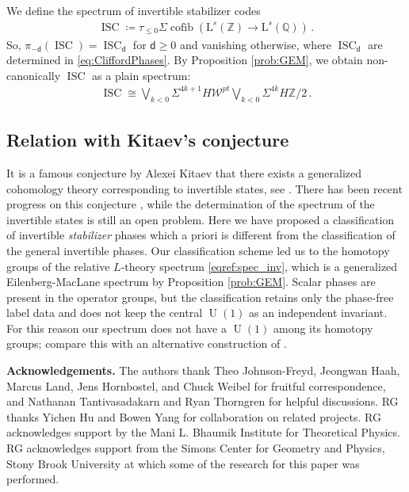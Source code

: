 \documentclass[sn-mathphys-num]{sn-jnl}
\theoremstyle{definition}
\numberwithin{equation}{section}
\theoremstyle{definition}
\def\CW {{\mathcal W}}
\def\L{{\mbox{L}}}
\def\IQ{\mathbb{Q}}
\def\IZ{{\mathbb{Z}}}
\newcommand{\dd}{{\mathsf{d}}} %
\begin{document}
We define the spectrum of invertible stabilizer codes
\begin{align}\label{eqref:spec_inv}
\operatorname{ISC}\coloneqq \tau_{\leqslant 0}\Sigma \operatorname{ cofib}( \L^s(\IZ)\rightarrow   
 \L^s(\IQ))\,.
\end{align}
So, $\pi_{-\dd}(\operatorname{ISC})= \operatorname{ISC}_{\dd}$ for $\dd\geqslant 0$ and vanishing otherwise, where $\operatorname{ISC}_{\dd}$ are determined in \eqref{eq:CliffordPhases}.
By Proposition \ref{prob:GEM}, we obtain non-canonically $\operatorname{ISC}$ as a plain spectrum:
 \begin{align}
\operatorname{ISC}\cong \bigvee_{k< 0}\Sigma ^{4k+1}H\CW^{pt}\bigvee_{k<0}\Sigma ^{4k} H\IZ/2\,.
\end{align}

\subsection{Relation with Kitaev's conjecture}
 It is a famous conjecture by Alexei Kitaev \cite{Kitaev} that there exists a generalized cohomology theory corresponding to invertible states, see \cite{kapustin2014symmetryprotectedtopologicalphases,xiong2018minimalist,Gaiotto_2019,Freed_2021,Shiozaki2022}. There has been recent progress on this conjecture \cite{kubota2025stablehomotopytheoryinvertible}, while the determination of the spectrum of the invertible states is still an open problem. Here we have proposed a classification of invertible \textit{stabilizer} phases which a priori is different from the classification of the general invertible phases. Our classification scheme led us to the homotopy groups of the relative $L$-theory spectrum \eqref{eqref:spec_inv}, which is a generalized Eilenberg-MacLane spectrum by Proposition \ref{prob:GEM}. Scalar phases are present in the operator groups, but the classification retains only the phase-free label data and does not keep the central $\operatorname{U}(1)$ as an independent invariant. For this reason our spectrum does not have a $\operatorname{U}(1)$ among its homotopy groups; compare this with an alternative construction of \cite{czajka2025anomalieslatticehomotopyquantum}.
\vspace{5mm}


\textbf{Acknowledgements.}
The authors thank Theo Johnson-Freyd, Jeongwan Haah, Marcus Land, Jens Hornbostel, and Chuck Weibel for fruitful correspondence, and Nathanan Tantivasadakarn and Ryan Thorngren for helpful discussions. RG thanks Yichen Hu and Bowen Yang for collaboration on related projects. RG acknowledges support by the Mani L. Bhaumik Institute for Theoretical Physics. RG acknowledges support from the Simons Center for Geometry and Physics, Stony Brook University at which some of the research for this paper was performed.
\end{document}

